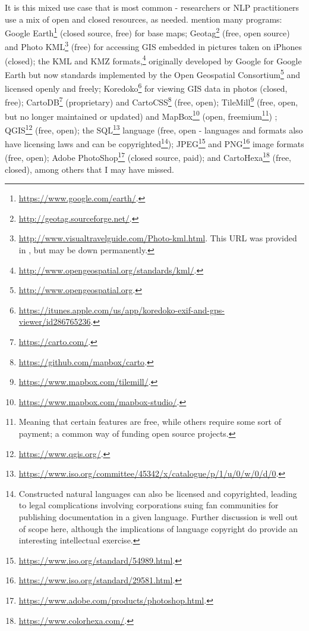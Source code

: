 It is this mixed use case that is most common - researchers or NLP practitioners use a mix of open and closed resources, as needed. \citet{gawne2016mapmaking} mention many programs: Google Earth\footnote{\href{https://www.google.com/earth/}{https://www.google.com/earth/}. } (closed source, free) for base maps; Geotag\footnote{\href{http://geotag.sourceforge.net/}{http://geotag.sourceforge.net/}. } (free, open source) and Photo KML\footnote{\href{http://www.visualtravelguide.com/Photo-kml.html}{http://www.visualtravelguide.com/Photo-kml.html}. This URL was provided in \citet{gawne2016mapmaking}, but may be down permanently.} (free) for accessing GIS embedded in pictures taken on iPhones (closed); the KML and KMZ formats,\footnote{\href{http://www.opengeospatial.org/standards/kml/}{http://www.opengeospatial.org/standards/kml/}. } originally developed by Google for Google Earth but now standards implemented by the Open Geospatial Consortium\footnote{\href{http://www.opengeospatial.org}{http://www.opengeospatial.org}. } and licensed openly and freely; Koredoko\footnote{\href{https://itunes.apple.com/us/app/koredoko-exif-and-gps-viewer/id286765236}{https://itunes.apple.com/us/app/koredoko-exif-and-gps-viewer/id286765236}. } for viewing GIS data in photos (closed, free); CartoDB\footnote{\href{https://carto.com/}{https://carto.com/}. } (proprietary) and CartoCSS\footnote{\href{https://github.com/mapbox/carto}{https://github.com/mapbox/carto}. } (free, open); TileMill\footnote{\href{https://www.mapbox.com/tilemill/}{https://www.mapbox.com/tilemill/}. } (free, open, but no longer maintained or updated) and MapBox\footnote{\href{https://www.mapbox.com/mapbox-studio/}{https://www.mapbox.com/mapbox-studio/}. } (open, freemium\footnote{Meaning that certain features are free, while others require some sort of payment; a common way of funding open source projects.}) ; QGIS\footnote{\href{https://www.qgis.org/}{https://www.qgis.org/}. } (free, open); the SQL\footnote{\href{https://www.iso.org/committee/45342/x/catalogue/p/1/u/0/w/0/d/0}{https://www.iso.org/committee/45342/x/catalogue/p/1/u/0/w/0/d/0}. } language (free, open - languages and formats also have licensing laws and can be copyrighted\footnote{Constructed natural languages can also be licensed and copyrighted, leading to legal complications involving corporations suing fan communities for publishing documentation in a given language. Further discussion is well out of scope here, although the implications of language copyright do provide an interesting intellectual exercise.});
JPEG\footnote{\href{https://www.iso.org/standard/54989.html}{https://www.iso.org/standard/54989.html}. } and PNG\footnote{\href{https://www.iso.org/standard/29581.html}{https://www.iso.org/standard/29581.html}. } image formats (free, open); Adobe PhotoShop\footnote{\href{https://www.adobe.com/products/photoshop.html}{https://www.adobe.com/products/photoshop.html}. } (closed source, paid); and CartoHexa\footnote{\href{https://www.colorhexa.com/}{https://www.colorhexa.com/}. } (free, closed), among others that I may have missed.

